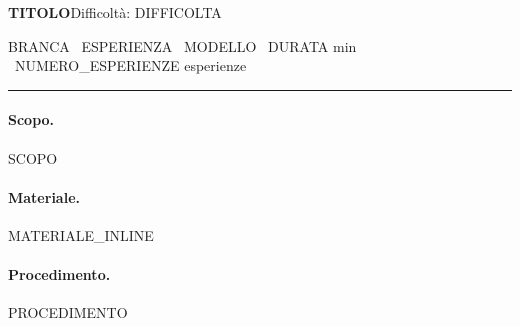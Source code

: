 \documentclass[10pt,a4paper]{article}
\begin{document}
\small

{\large\bfseries {{TITOLO}}}\hfill{\small Difficoltà: {{DIFFICOLTA}}}\par
{\footnotesize
  {{BRANCA}} \textperiodcentered\ {{ESPERIENZA}} \textperiodcentered\ {{MODELLO}}
  \textperiodcentered\ {{DURATA}} min
  \textperiodcentered\ {{NUMERO_ESPERIENZE}} esperienze\par
}
\vspace{2pt}\hrule\vspace{4pt}

\paragraph{Scopo.} {{SCOPO}}

\paragraph{Materiale.} {{MATERIALE_INLINE}}

\paragraph{Procedimento.} {{PROCEDIMENTO}}
\end{document}
